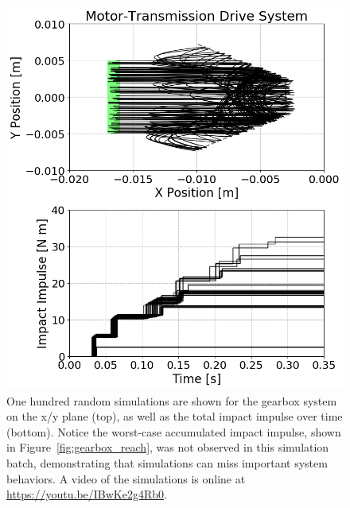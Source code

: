\begin{figure}[t]
\begin{minipage}{0.48\textwidth}
\centerline{\includegraphics[width=0.98\columnwidth]{images/gearbox_sim.png}}
\caption{{ One hundred random simulations are shown for the gearbox system on the x/y plane (top), as well as the total impact impulse over time (bottom).
%
Notice the worst-case accumulated impact impulse, shown in Figure~\ref{fig:gearbox_reach}, was not observed in this simulation batch,
demonstrating that simulations can miss important system behaviors.
%
A video of the simulations is online at \url{https://youtu.be/IBwKe2g4Rb0}.}}


\end{minipage}
\end{figure}
